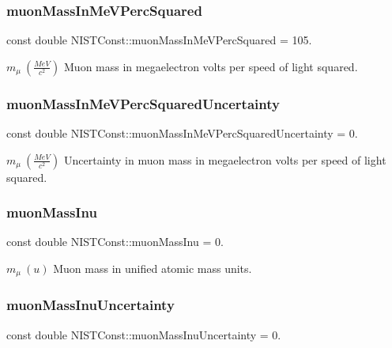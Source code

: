\subsubsection{\texorpdfstring{muon\+Mass\+In\+Me\+V\+Perc\+Squared}{muonMassInMeVPercSquared}}
{\footnotesize\ttfamily const double N\+I\+S\+T\+Const\+::muon\+Mass\+In\+Me\+V\+Perc\+Squared = 105.}

$m_\mu \ (\frac{MeV}{c^2})$ Muon mass in megaelectron volts per speed of light squared. \mbox{\label{group___n_i_s_t_const-_muon_ga1958d52051686be59d9e4a7ad3a69fa1}} 
\subsubsection{\texorpdfstring{muon\+Mass\+In\+Me\+V\+Perc\+Squared\+Uncertainty}{muonMassInMeVPercSquaredUncertainty}}
{\footnotesize\ttfamily const double N\+I\+S\+T\+Const\+::muon\+Mass\+In\+Me\+V\+Perc\+Squared\+Uncertainty = 0.}

$m_\mu \ (\frac{MeV}{c^2})$ Uncertainty in muon mass in megaelectron volts per speed of light squared. \mbox{\label{group___n_i_s_t_const-_muon_gaa24722892f878b56a8aa97cca27ed908}} 
\subsubsection{\texorpdfstring{muon\+Mass\+Inu}{muonMassInu}}
{\footnotesize\ttfamily const double N\+I\+S\+T\+Const\+::muon\+Mass\+Inu = 0.}

$m_\mu \ (u)$ Muon mass in unified atomic mass units. \mbox{\label{group___n_i_s_t_const-_muon_ga55f39b59c02eb2265b4d62332643a439}} 
\subsubsection{\texorpdfstring{muon\+Mass\+Inu\+Uncertainty}{muonMassInuUncertainty}}
{\footnotesize\ttfamily const double N\+I\+S\+T\+Const\+::muon\+Mass\+Inu\+Uncertainty = 0.}

